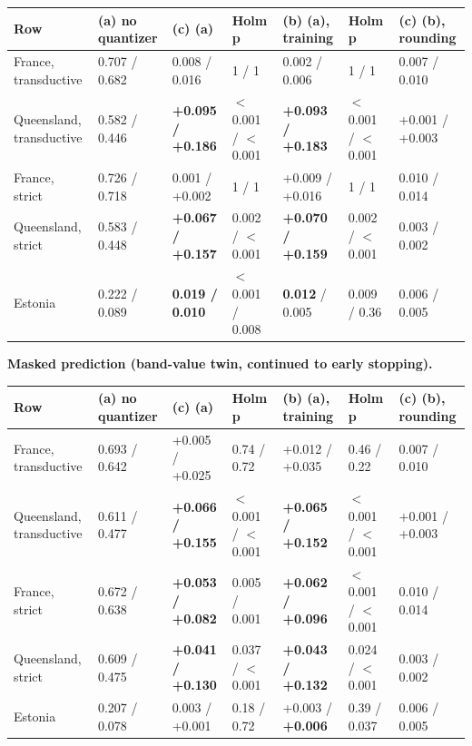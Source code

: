 \documentclass[10pt]{article}
\begin{document}
{\footnotesize
\begin{xltabular}{\linewidth}{@{}llllllX@{}}
\toprule
Row & (a) no quantizer & (c) \textminus{} (a) & Holm p & (b) \textminus{} (a), training & Holm p & (c) \textminus{} (b), rounding \\
\midrule
\endhead
France, transductive & 0.707 / 0.682 & \textminus{}0.008 / \textminus{}0.016 & 1 / 1 & \textminus{}0.002 / \textminus{}0.006 & 1 / 1 & \textminus{}0.007 / \textminus{}0.010 \\
Queensland, transductive & 0.582 / 0.446 & \textbf{+0.095 / +0.186} & $<$0.001 / $<$0.001 & \textbf{+0.093 / +0.183} & $<$0.001 / $<$0.001 & +0.001 / +0.003 \\
France, strict & 0.726 / 0.718 & \textminus{}0.001 / +0.002 & 1 / 1 & +0.009 / +0.016 & 1 / 1 & \textminus{}0.010 / \textminus{}0.014 \\
Queensland, strict & 0.583 / 0.448 & \textbf{+0.067 / +0.157} & 0.002 / $<$0.001 & \textbf{+0.070 / +0.159} & 0.002 / $<$0.001 & \textminus{}0.003 / \textminus{}0.002 \\
Estonia & 0.222 / 0.089 & \textbf{\textminus{}0.019 / \textminus{}0.010} & $<$0.001 / 0.008 & \textbf{\textminus{}0.012} / \textminus{}0.005 & 0.009 / 0.36 & \textminus{}0.006 / \textminus{}0.005 \\
\bottomrule
\end{xltabular}}

\textbf{Masked prediction (band-value twin, continued to early stopping).}

{\footnotesize
\begin{xltabular}{\linewidth}{@{}llllllX@{}}
\toprule
Row & (a) no quantizer & (c) \textminus{} (a) & Holm p & (b) \textminus{} (a), training & Holm p & (c) \textminus{} (b), rounding \\
\midrule
\endhead
France, transductive & 0.693 / 0.642 & +0.005 / +0.025 & 0.74 / 0.72 & +0.012 / +0.035 & 0.46 / 0.22 & \textminus{}0.007 / \textminus{}0.010 \\
Queensland, transductive & 0.611 / 0.477 & \textbf{+0.066 / +0.155} & $<$0.001 / $<$0.001 & \textbf{+0.065 / +0.152} & $<$0.001 / $<$0.001 & +0.001 / +0.003 \\
France, strict & 0.672 / 0.638 & \textbf{+0.053 / +0.082} & 0.005 / 0.001 & \textbf{+0.062 / +0.096} & $<$0.001 / $<$0.001 & \textminus{}0.010 / \textminus{}0.014 \\
Queensland, strict & 0.609 / 0.475 & \textbf{+0.041 / +0.130} & 0.037 / $<$0.001 & \textbf{+0.043 / +0.132} & 0.024 / $<$0.001 & \textminus{}0.003 / \textminus{}0.002 \\
Estonia & 0.207 / 0.078 & \textminus{}0.003 / +0.001 & 0.18 / 0.72 & +0.003 / \textbf{+0.006} & 0.39 / 0.037 & \textminus{}0.006 / \textminus{}0.005 \\
\bottomrule
\end{xltabular}}
\end{document}
